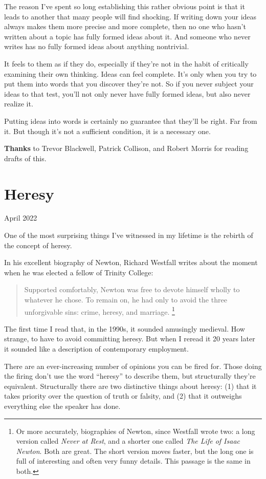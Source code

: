 \documentclass[12pt]{book}
\begin{document}
The reason I've spent so long establishing this rather obvious point is
that it leads to another that many people will find shocking. If writing
down your ideas always makes them more precise and more complete, then
no one who hasn't written about a topic has fully formed ideas about it.
And someone who never writes has no fully formed ideas about anything
nontrivial.

It feels to them as if they do, especially if they're not in the habit
of critically examining their own thinking. Ideas can feel complete.
It's only when you try to put them into words that you discover they're
not. So if you never subject your ideas to that test, you'll not only
never have fully formed ideas, but also never realize it.

Putting ideas into words is certainly no guarantee that they'll be
right. Far from it. But though it's not a sufficient condition, it is a
necessary one.


\textbf{Thanks} to Trevor Blackwell, Patrick Collison, and Robert Morris
for reading drafts of this.
\chapter{Heresy}

April 2022

One of the most surprising things I've witnessed in my lifetime is the
rebirth of the concept of heresy.

In his excellent biography of Newton, Richard Westfall writes about the
moment when he was elected a fellow of Trinity College:

\begin{quote}
Supported comfortably, Newton was free to devote himself wholly to
whatever he chose. To remain on, he had only to avoid the three
unforgivable sins: crime, heresy, and marriage. \footnote{Or more accurately, biographies of Newton, since Westfall wrote
two: a long version called \emph{Never at Rest}, and a shorter one
called \emph{The Life of Isaac Newton}. Both are great. The short
version moves faster, but the long one is full of interesting and often
very funny details. This passage is the same in both.}
\end{quote}

The first time I read that, in the 1990s, it sounded amusingly medieval.
How strange, to have to avoid committing heresy. But when I reread it 20
years later it sounded like a description of contemporary employment.

There are an ever-increasing number of opinions you can be fired for.
Those doing the firing don't use the word ``heresy'' to describe them,
but structurally they're equivalent. Structurally there are two
distinctive things about heresy: (1) that it takes priority over the
question of truth or falsity, and (2) that it outweighs everything else
the speaker has done.
\end{document}
